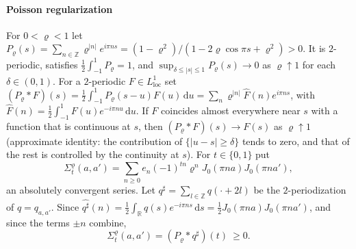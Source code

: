 \documentclass[preprint,12pt,a4paper]{elsarticle}
\theoremstyle{remark}
\newcommand{\R}{\mathbb R}
\newcommand{\dd}{\,\mathrm d}
\begin{document}
\paragraph{Poisson regularization}
For $0<\varrho<1$ let $P_\varrho(s)=\sum_{n\in\mathbb Z}\varrho^{|n|}e^{i\pi ns}
=(1-\varrho^2)/(1-2\varrho\cos\pi s+\varrho^2)>0$. It is $2$-periodic, satisfies
$\frac12\int_{-1}^1P_\varrho=1$, and $\sup_{\delta\le|s|\le1}P_\varrho(s)\to0$
as $\varrho\uparrow1$ for each $\delta\in(0,1)$. For a $2$-periodic $F\in L^1_{\mathrm{loc}}$
set $(P_\varrho*F)(s)=\frac12\int_{-1}^1P_\varrho(s-u)F(u)\dd u
=\sum_n\varrho^{|n|}\widehat F(n)e^{i\pi ns}$, with
$\widehat F(n)=\frac12\int_{-1}^1F(u)e^{-i\pi nu}\dd u$. If $F$ coincides almost
everywhere near $s$ with a function that is continuous at $s$, then
$(P_\varrho*F)(s)\to F(s)$ as $\varrho\uparrow1$ (approximate identity: the
contribution of $\{|u-s|\ge\delta\}$ tends to zero, and that of the rest is
controlled by the continuity at $s$). For $t\in\{0,1\}$ put
\[
 \Sigma_t^\varrho(a,a')=\sum_{n\ge0}e_n(-1)^{tn}\varrho^nJ_0(\pi na)J_0(\pi na'),
\]
an absolutely convergent series. Let $q^\sharp=\sum_{l\in\mathbb Z}q(\cdot+2l)$ be the
$2$-periodization of $q=q_{a,a'}$. Since $\widehat{q^\sharp}(n)=\frac12\int_\R q(s)e^{-i\pi ns}\dd s
=\frac12J_0(\pi na)J_0(\pi na')$, and since the terms $\pm n$ combine,
\begin{equation}\label{eq:abel-identity}
 \Sigma_t^\varrho(a,a')=(P_\varrho*q^\sharp)(t)\ \ge0 .
\end{equation}
\end{document}
